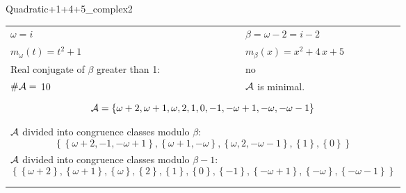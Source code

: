 \begin{exmp}
\label{ex:compareAQ}

Quadratic+1+4+5\_complex2

\rule{0cm}{0cm}

\begin{tabular}{ll}
$\omega=  i $  & $\beta= \omega - 2 = i - 2 $\\
$m_\omega(t)=  t^{2} + 1 $  & $m_\beta(x)=  x^{2} + 4 \, x + 5 $\\
Real conjugate of $\beta$ greater than 1:   &  no \\
$\#\mathcal{A}= $ 10 $ $ & $\mathcal{A}$ is minimal. \\
\multicolumn{2}{l}{\begin{minipage}{\textwidth}\begin{dmath*}\A = \left\{\omega + 2, \omega + 1, \omega, 2, 1, 0, -1, -\omega + 1, -\omega, -\omega - 1\right\}  \end{dmath*}\end{minipage} }\\
\multicolumn{2}{l}{\begin{minipage}{\textwidth}$\mathcal{A}$ divided into congruence classes modulo $\beta$: \begin{dmath*} \left\{\left\{\omega + 2, -1, -\omega + 1\right\}, \left\{\omega + 1, -\omega\right\}, \left\{\omega, 2, -\omega - 1\right\}, \left\{1\right\}, \left\{0\right\}\right\}  \end{dmath*}\end{minipage} }\\[10pt]
\multicolumn{2}{l}{\begin{minipage}{\textwidth}$\mathcal{A}$ divided into congruence classes modulo $\beta-1$: \begin{dmath*} \left\{\left\{\omega + 2\right\}, \left\{\omega + 1\right\}, \left\{\omega\right\}, \left\{2\right\}, \left\{1\right\}, \left\{0\right\}, \left\{-1\right\}, \left\{-\omega + 1\right\}, \left\{-\omega\right\}, \left\{-\omega - 1\right\}\right\}  \end{dmath*}\end{minipage} }\\
 & \\ \hline
 & \\
\end{tabular}


\end{exmp}
